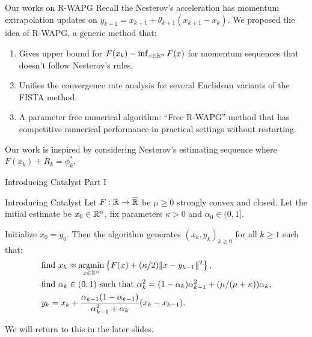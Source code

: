 \documentclass[11pt]{beamer}
\theoremstyle{definition}
\begin{document}
        \begin{frame}{Our works on R-WAPG}
            Recall the Nesterov's acceleration has momentum extrapolation updates on $y_{k + 1} = x_{k + 1} + \theta_{k + 1}(x_{k + 1} - x_k)$. 
            We proposed the idea of R-WAPG, a generic method that: 
            \begin{enumerate}
                \item Gives upper bound for $F(x_k) - \inf_{x \in \mathbb R^n} F(x)$ for momentum sequences that doesn't follow Nesterov's rules.
                \item Unifies the convergence rate analysis for several Euclidean variants of the FISTA method. 
                \item A parameter free numerical algorithm: ``Free R-WAPG'' method that has competitive numerical performance in practical settings without restarting. 
            \end{enumerate}
            Our work is inspired by considering Nesterov's estimating sequence where $F(x_k) + R_k = \phi_k^*$. 
        \end{frame}
        \begin{frame}{Introducing Catalyst Part I}
            \begin{block}{Introducing Catalyst}
                Let $F:\mathbb R \rightarrow \overline {\mathbb R}$ be $\mu \ge 0$ strongly convex and closed. 
                Let the initial estimate be $x_0 \in \mathbb R^n$, fix parameters $\kappa > 0$ and $\alpha_0 \in (0, 1]$. 
                {\small 
                \begin{tcolorbox}
                    Initialize $x_0 = y_0$. Then the algorithm generates $(x_k, y_k)_{k\ge 0}$ for all $k \ge 1$ such that: 
                    \begin{align*}
                        & \text{find } x_k \approx \mathop{\rm argmin}\limits_{x \in \mathbb R^n} \left\lbrace F(x) + (\kappa/2)\Vert x - y_{k - 1}\Vert^2\right\rbrace, 
                        \\
                        & \text{find } \alpha_k \in (0, 1) \text{ such that } \alpha_k^2 = (1 - \alpha_k)\alpha_{k - 1}^2 + (\mu/(\mu + \kappa))\alpha_k,
                        \\
                        & 
                        y_{k} = x_k + \frac{\alpha_{k - 1}(1 - \alpha_{k - 1})}{\alpha_{k - 1}^2 + \alpha_k}(x_k - x_{k - 1}). 
                    \end{align*}
                \end{tcolorbox}
                }
            \end{block}
            We will return to this in the later slides. 
        \end{frame}
\end{document}
